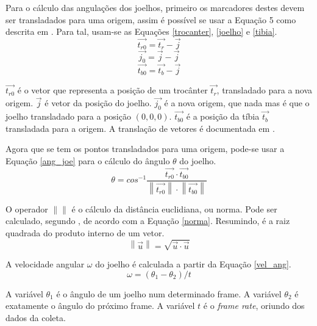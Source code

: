 Para o cálculo das angulações dos joelhos, primeiro os marcadores destes devem ser transladados para uma origem, assim é possível se usar a Equação 5 como descrita em . 
Para tal, usam-se as Equações \ref{trocanter}, \ref{joelho} e \ref{tibia}.
\begin{equation}
	\label{trocanter}
	\vec{t_{r0}} = \vec{t_r} - \vec{j}
\end{equation}
\begin{equation}
	\label{joelho}
	\vec{j_0} = \vec{j} - \vec{j}
\end{equation}
\begin{equation}
	\label{tibia}
	\vec{t_{b0}} = \vec{t_b} - \vec{j}
\end{equation}

$\vec{t_{r0}}$ é o vetor que representa a posição de um trocânter $\vec{t_r}$, transladado para a nova origem.
$\vec{j}$ é vetor da posição do joelho.
$\vec{j_0}$ é a nova origem, que nada mas é que o joelho transladado para a posição $(0,0,0)$. 
$\vec{t_{b0}}$ é a posição da tíbia $\vec{t_b}$ transladada para a origem.
A translação de vetores é documentada em .

Agora que se tem os pontos transladados para uma origem, pode-se usar a Equação \ref{ang_joe} para o cálculo do ângulo $\theta$ do joelho.
\begin{equation}
	\label{ang_joe}
	\theta =
		cos^{-1} 
		\frac
		{
			\vec{t_{r0}} \cdot \vec{t_{b0}}
		}
		{
			\left \| \vec{t_{r0}} \right \|
			\cdot
			\left \| \vec{t_{b0}} \right \|
		}
\end{equation}

O operador $\left \| \right \|$ é o cálculo da distância euclidiana, ou norma. Pode ser calculado, segundo , de acordo com a Equação \ref{norma}. Resumindo, é a raiz quadrada do produto interno de um vetor.
\begin{equation}
	\label{norma}
	\left \| \vec{u} \right \| = \sqrt{\vec{u}\cdot\vec{u}}
\end{equation}

A velocidade angular $\omega$ do joelho é calculada a partir da Equação \ref{vel_ang}.
\begin{equation}
	\label{vel_ang}
	\omega = (\theta_1 - \theta_2) / t
\end{equation}

A variável $\theta_1$ é o ângulo de um joelho num determinado frame. A variável $\theta_2$ é exatamente o ângulo do próximo frame. A variável $t$ é o \emph{frame rate}, oriundo dos dados da coleta.


